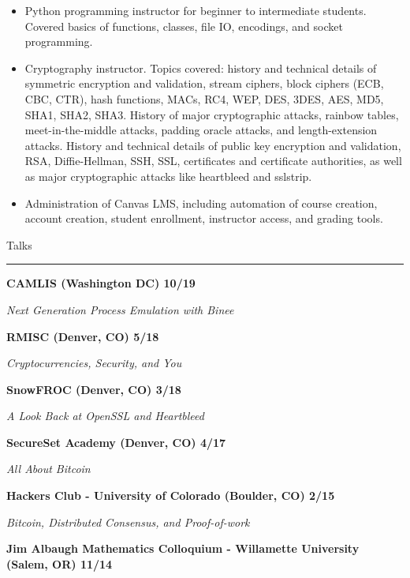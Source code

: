 \documentclass{letter}
\begin{document}
\begin{itemize}
    \setlength\itemsep{-0.5em}
    \item Python programming instructor for beginner to intermediate students. Covered basics of functions, classes, file IO, encodings, and socket programming.
    \item Cryptography instructor.  Topics covered: history and technical details of symmetric encryption and validation, stream ciphers, block ciphers (ECB, CBC, CTR), hash functions, MACs, RC4, WEP, DES, 3DES, AES, MD5, SHA1, SHA2, SHA3.  History of major cryptographic attacks, rainbow tables, meet-in-the-middle attacks, padding oracle attacks, and length-extension attacks.  History and technical details of public key encryption and validation, RSA, Diffie-Hellman, SSH, SSL, certificates and certificate authorities, as well as major cryptographic attacks like heartbleed and sslstrip.
    \item Administration of Canvas LMS, including automation of course creation, account creation, student enrollment, instructor access, and grading tools.
\end{itemize}

\vspc



\large{Talks}
\vskip1mm
\hrule

\textbf{CAMLIS (Washington DC) \hfill 10/19}

\textit{Next Generation Process Emulation with Binee}

\textbf{RMISC (Denver, CO) \hfill 5/18}

\textit{Cryptocurrencies, Security, and You}

\textbf{SnowFROC (Denver, CO) \hfill 3/18}

\textit{A Look Back at OpenSSL and Heartbleed}

\textbf{SecureSet Academy (Denver, CO) \hfill 4/17}

\textit{All About Bitcoin}

\textbf{Hackers Club - University of Colorado (Boulder, CO) \hfill 2/15}

\textit{Bitcoin, Distributed Consensus, and Proof-of-work}

\textbf{Jim Albaugh Mathematics Colloquium - Willamette University (Salem, OR) \hfill 11/14}
\end{document}
